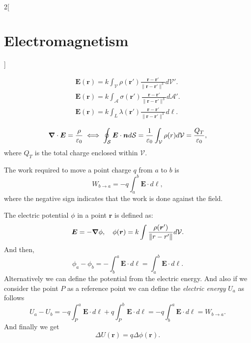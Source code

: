 \documentclass[../../../main.tex]{subfiles}
\begin{document}
\begin{multicols}{2}[\section{Electromagnetism}]
\begin{concept}
        \begin{gather*}
            \boldsymbol{E}(\boldsymbol{r})=k\int_\mathcal{V}\rho(\boldsymbol{r}')\frac{\boldsymbol{r}-\boldsymbol{r}'}{\|\boldsymbol{r}-\boldsymbol{r}'\|^3}d\mathcal{V}'.\\
            \boldsymbol{E}(\boldsymbol{r})=k\int_\mathcal{A}\sigma(\boldsymbol{r}')\frac{\boldsymbol{r}-\boldsymbol{r}'}{\|\boldsymbol{r}-\boldsymbol{r}'\|^3}d\mathcal{A}'.\\
            \boldsymbol{E}(\boldsymbol{r})=k\int_L\lambda(\boldsymbol{r}')\frac{\boldsymbol{r}-\boldsymbol{r}'}{\|\boldsymbol{r}-\boldsymbol{r}'\|^3}d\ell.
        \end{gather*}
    \end{concept}
    \begin{concept}
        \begin{equation}
            \grad\cdot\boldsymbol{E}=\frac{\rho}{\varepsilon_0}\iff\oint_\mathcal{S}\boldsymbol{E}\cdot\boldsymbol{n}d\mathcal{S}=\frac{1}{\varepsilon_0}\int_\mathcal{V}\rho(r)d\mathcal{V}=\frac{Q_T}{\varepsilon_0},
            \label{gauss}
        \end{equation} where $Q_T$ is the total charge enclosed within $\mathcal{V}$.
    \end{concept}
    \begin{concept}[Work]
        The work required to move a point charge $q$ from $a$ to $b$ is $$W_{b\to a}=-q\int_a^b\boldsymbol{E}\cdot d\ell,$$ where the negative sign indicates that the work is done against the field.
    \end{concept}
    \begin{concept}
        The electric potential $\phi$ in a point $\boldsymbol{r}$ is defined as:
        \begin{equation}
            \boldsymbol{E}=-\grad\phi,\quad\phi(\boldsymbol{r})=k\int\frac{\rho(\boldsymbol{r}')}{\|r-r'\|}d\mathcal{V}.
            \label{potential}
        \end{equation} And then, $$\phi_a-\phi_b=-\int_b^a\boldsymbol{E}\cdot d\ell=\int_a^b\boldsymbol{E}\cdot d\ell.$$ Alternatively we can define the potential from the electric energy.  And also if we consider the point $P$ as a reference point we can define the \textit{electric energy} $U_a$ as follows $$U_a-U_b=-q\int_P^a\boldsymbol{E}\cdot d\ell+q\int_P^b\boldsymbol{E}\cdot d\ell=-q\int_b^a\boldsymbol{E}\cdot d\ell=W_{b\to a}.$$ And finally we get $$\Delta U(\boldsymbol{r})=q\Delta\phi(\boldsymbol{r}).$$

\end{concept}
\end{multicols}
\end{document}
